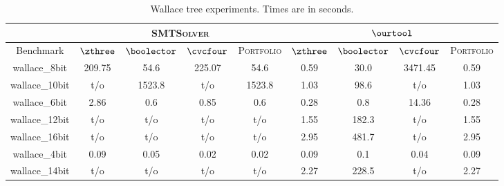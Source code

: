 \begin{table}[t]
\centering
\caption{Wallace tree experiments. Times are in seconds.}
\label{my-label}
\begin{tabular}{|c|c|c|c|c|c|c|c|c|}
\hline
               & \multicolumn{4}{c|}{\textsc{SMTSolver}}                    & \multicolumn{4}{c|}{$\ourtool$}                              \\ \hline
Benchmark      & $\zthree$ & $\boolector$ & $\cvcfour$ & \textsc{Portfolio} & $\zthree$ & $\boolector$ & $\cvcfour$ & \textsc{Portfolio} \\ \hline
wallace\_8bit  & 209.75    & 54.6         & 225.07     & 54.6                 & 0.59      & 30.0         & 3471.45    & 0.59                 \\ \hline
wallace\_10bit & t/o       & 1523.8       & t/o        & 1523.8               & 1.03      & 98.6         & t/o        & 1.03                 \\ \hline
wallace\_6bit  & 2.86      & 0.6          & 0.85       & 0.6                  & 0.28      & 0.8          & 14.36      & 0.28                 \\ \hline
wallace\_12bit & t/o       & t/o          & t/o        & t/o                  & 1.55      & 182.3        & t/o        & 1.55                 \\ \hline
wallace\_16bit & t/o       & t/o          & t/o        & t/o                  & 2.95      & 481.7        & t/o        & 2.95                 \\ \hline
wallace\_4bit  & 0.09      & 0.05         & 0.02       & 0.02                 & 0.09      & 0.1          & 0.04       & 0.09                 \\ \hline
wallace\_14bit & t/o       & t/o          & t/o        & t/o                  & 2.27      & 228.5        & t/o        & 2.27                 \\ \hline
\end{tabular}
\end{table}

